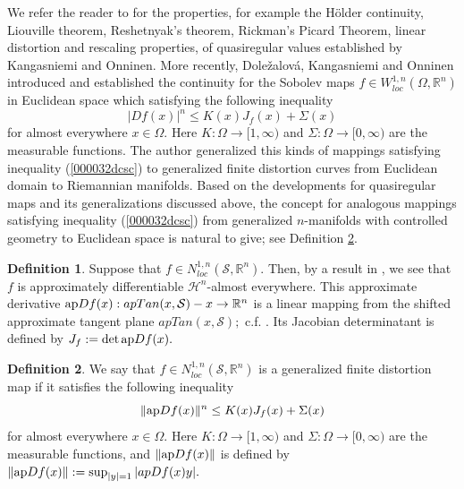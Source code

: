 \documentclass[11pt,twoside]{article}
\theoremstyle{definition}
\newtheorem{defn}{Definition}[section]
\theoremstyle{remark}
\begin{document}
We refer the reader to \cite{KO222,KO241, KO242} for the properties, for example the H\"{o}lder continuity, Liouville theorem, Reshetnyak’s theorem, Rickman’s Picard Theorem,  linear distortion and rescaling properties,  of  quasiregular values established by  Kangasniemi and  Onninen. More recently, Dole\v{z}alov\'{a},  Kangasniemi and Onninen \cite{DKO24} introduced and established the continuity for the Sobolev maps $f\in W_{loc}^{1,n}(\Omega,\mathbb{R}^{n})$ in Euclidean space which satisfying the following inequality
\begin{equation}\label{000032dcsc}
\vert Df(x)\vert^{n}\leq K(x) J_{f}(x)+\Sigma(x)
\end{equation}
for almost everywhere $x\in\Omega.$ Here $K:\Omega\rightarrow[1,\infty)$ and $\Sigma:\Omega\rightarrow[0,\infty)$ are the measurable functions. The author \cite{Zho252} generalized this kinds of mappings satisfying inequality (\ref{000032dcsc}) to generalized finite distortion curves from Euclidean domain to Riemannian manifolds.  Based on the developments for quasiregular maps and its generalizations discussed above, the concept for analogous mappings satisfying inequality (\ref{000032dcsc}) from generalized $n$-manifolds with controlled geometry to Euclidean space is natural to give; see Definition \ref{df1}. 
\begin{defn}
Suppose that $f\in N_{loc}^{1,n}(\mathcal{S},\mathbb{R}^{n}).$ Then, by a result in \cite[Corollary 2.17]{Kir14}, we see that $f$ is approximately differentiable $\mathcal{H}^{n}$-almost everywhere. This 
approximate derivative ${\rm ap}Df(x):apTan(x,\mathcal{S})-x\rightarrow \mathbb{R}^{n}$ is a linear mapping from the shifted approximate tangent plane $apTan(x,\mathcal{S});$ c.f. \cite[Definition 3.2.16]{Fed69}.
Its Jacobian determinatant is defined by $J_{f}:={\rm det\,ap}Df(x).$
\end{defn}



\begin{defn}\label{df1}
We say that $f\in N_{loc}^{1,n}(\mathcal{S},\mathbb{R}^{n})$ is a generalized finite distortion map if it satisfies the following inequality
\begin{equation}
\| {\rm ap}Df(x)\|^{n}\leq K(x)J_{f}(x)+\Sigma(x)
\end{equation}
for almost everywhere $x\in\Omega.$ Here $K:\Omega\rightarrow[1,\infty)$ and $\Sigma:\Omega\rightarrow[0,\infty)$ are the measurable functions, and $\| {\rm ap}Df(x)\|$ is defined by 
$\| {\rm ap}Df(x)\|:=\sup_{\vert y\vert=1}\vert apDf(x)y\vert.$
\end{defn}
\end{document}

